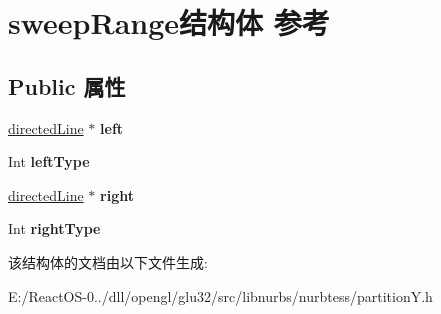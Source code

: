 \hypertarget{structsweep_range}{}\section{sweep\+Range结构体 参考}
\label{structsweep_range}
\subsection*{Public 属性}
\begin{DoxyCompactItemize}
\item 
\mbox{\label{structsweep_range_aedbd6b0ee197690bdc52dcf2cc1c0707}} 
\hyperlink{classdirected_line}{directed\+Line} $\ast$ {\bfseries left}
\item 
\mbox{\label{structsweep_range_a9fcb2b91adf6c65ad588a38f3a28112c}} 
Int {\bfseries left\+Type}
\item 
\mbox{\label{structsweep_range_ae2e2d9d8faeab00cb19edcf32f3f7b72}} 
\hyperlink{classdirected_line}{directed\+Line} $\ast$ {\bfseries right}
\item 
\mbox{\label{structsweep_range_ad60d9fb9aa5b9aefb5322a4c5a84090c}} 
Int {\bfseries right\+Type}
\end{DoxyCompactItemize}


该结构体的文档由以下文件生成\+:\begin{DoxyCompactItemize}
\item 
E\+:/\+React\+O\+S-\/0../dll/opengl/glu32/src/libnurbs/nurbtess/partition\+Y.\+h\end{DoxyCompactItemize}
